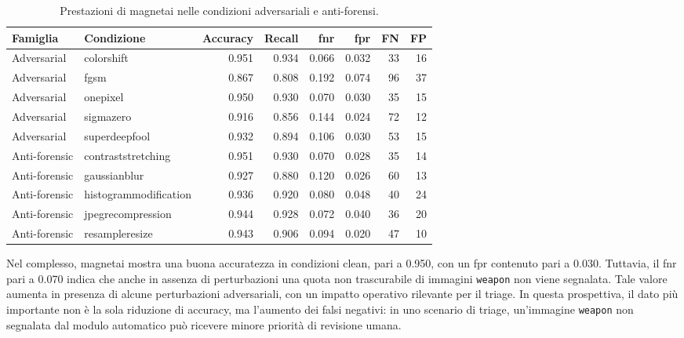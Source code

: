 \begin{table}[H]
\centering
\caption{Prestazioni di \gls{magnetai} nelle condizioni adversariali e anti-forensi.}
\label{tab:results-magnet-attack-metrics}
\scriptsize
\renewcommand{\arraystretch}{1.12}
\setlength{\tabcolsep}{4pt}
\begin{tabular}{@{}l l r r r r r r@{}}
\toprule
\textbf{Famiglia} &
\textbf{Condizione} &
\textbf{Accuracy} &
\textbf{Recall} &
\textbf{\gls{fnr}} &
\textbf{\gls{fpr}} &
\textbf{FN} &
\textbf{FP} \\
\midrule

Adversarial &
\gls{colorshift} &
0.951 &
0.934 &
0.066 &
0.032 &
33 &
16 \\

Adversarial &
\gls{fgsm} &
0.867 &
0.808 &
0.192 &
0.074 &
96 &
37 \\

Adversarial &
\gls{onepixel} &
0.950 &
0.930 &
0.070 &
0.030 &
35 &
15 \\

Adversarial &
\gls{sigmazero} &
0.916 &
0.856 &
0.144 &
0.024 &
72 &
12 \\

Adversarial &
\gls{superdeepfool} &
0.932 &
0.894 &
0.106 &
0.030 &
53 &
15 \\

\midrule

Anti-forensic &
\gls{contraststretching} &
0.951 &
0.930 &
0.070 &
0.028 &
35 &
14 \\

Anti-forensic &
\gls{gaussianblur} &
0.927 &
0.880 &
0.120 &
0.026 &
60 &
13 \\

Anti-forensic &
\gls{histogrammodification} &
0.936 &
0.920 &
0.080 &
0.048 &
40 &
24 \\

Anti-forensic &
\gls{jpegrecompression} &
0.944 &
0.928 &
0.072 &
0.040 &
36 &
20 \\

Anti-forensic &
\gls{resampleresize} &
0.943 &
0.906 &
0.094 &
0.020 &
47 &
10 \\

\bottomrule
\end{tabular}
\end{table}

Nel complesso, \gls{magnetai} mostra una buona accuratezza in condizioni clean,
pari a 0.950, con un \gls{fpr} contenuto pari a 0.030. Tuttavia, il \gls{fnr}
pari a 0.070 indica che anche in assenza di perturbazioni una quota non
trascurabile di immagini \texttt{weapon} non viene segnalata. Tale valore aumenta
in presenza di alcune perturbazioni adversariali, con un impatto operativo
rilevante per il triage. In questa prospettiva, il dato più importante non è la
sola riduzione di accuracy, ma l'aumento dei falsi negativi: in uno scenario di
triage, un'immagine \texttt{weapon} non segnalata dal modulo automatico può
ricevere minore priorità di revisione umana.

